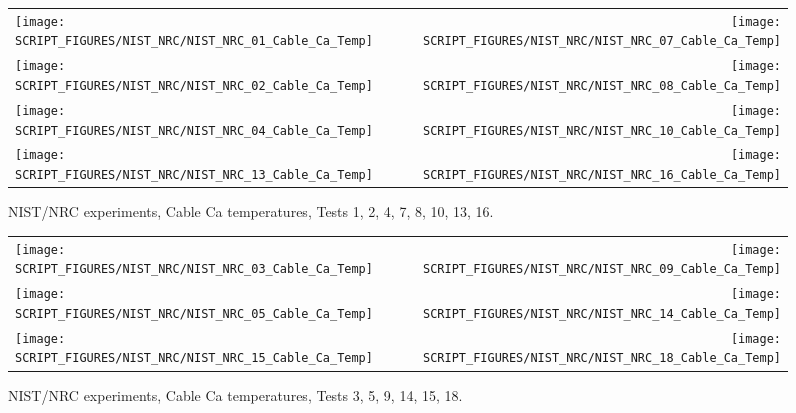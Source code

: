 \begin{figure}[p]
\begin{tabular*}{\textwidth}{l@{\extracolsep{\fill}}r}
\texttt{[image: SCRIPT\_FIGURES/NIST\_NRC/NIST\_NRC\_01\_Cable\_Ca\_Temp]} &
\texttt{[image: SCRIPT\_FIGURES/NIST\_NRC/NIST\_NRC\_07\_Cable\_Ca\_Temp]} \\
\texttt{[image: SCRIPT\_FIGURES/NIST\_NRC/NIST\_NRC\_02\_Cable\_Ca\_Temp]} &
\texttt{[image: SCRIPT\_FIGURES/NIST\_NRC/NIST\_NRC\_08\_Cable\_Ca\_Temp]} \\
\texttt{[image: SCRIPT\_FIGURES/NIST\_NRC/NIST\_NRC\_04\_Cable\_Ca\_Temp]} &
\texttt{[image: SCRIPT\_FIGURES/NIST\_NRC/NIST\_NRC\_10\_Cable\_Ca\_Temp]} \\
\texttt{[image: SCRIPT\_FIGURES/NIST\_NRC/NIST\_NRC\_13\_Cable\_Ca\_Temp]} &
\texttt{[image: SCRIPT\_FIGURES/NIST\_NRC/NIST\_NRC\_16\_Cable\_Ca\_Temp]}
\end{tabular*}
\caption[NIST/NRC experiments, Cable Ca temperatures, Tests 1, 2, 4, 7, 8, 10, 13, 16]{NIST/NRC experiments, Cable Ca temperatures, Tests 1, 2, 4, 7, 8, 10, 13, 16.}
\label{NIST_NRC_Cable_Ca_Closed}
\end{figure}

\begin{figure}[p]
\begin{tabular*}{\textwidth}{l@{\extracolsep{\fill}}r}
\texttt{[image: SCRIPT\_FIGURES/NIST\_NRC/NIST\_NRC\_03\_Cable\_Ca\_Temp]} &
\texttt{[image: SCRIPT\_FIGURES/NIST\_NRC/NIST\_NRC\_09\_Cable\_Ca\_Temp]} \\
\texttt{[image: SCRIPT\_FIGURES/NIST\_NRC/NIST\_NRC\_05\_Cable\_Ca\_Temp]} &
\texttt{[image: SCRIPT\_FIGURES/NIST\_NRC/NIST\_NRC\_14\_Cable\_Ca\_Temp]} \\
\texttt{[image: SCRIPT\_FIGURES/NIST\_NRC/NIST\_NRC\_15\_Cable\_Ca\_Temp]} &
\texttt{[image: SCRIPT\_FIGURES/NIST\_NRC/NIST\_NRC\_18\_Cable\_Ca\_Temp]}
\end{tabular*}
\caption[NIST/NRC experiments, Cable Ca temperatures, Tests 3, 5, 9, 14, 15, 18]{NIST/NRC experiments, Cable Ca temperatures, Tests 3, 5, 9, 14, 15, 18.}
\label{NIST_NRC_Cable_Ca_Open}
\end{figure}

